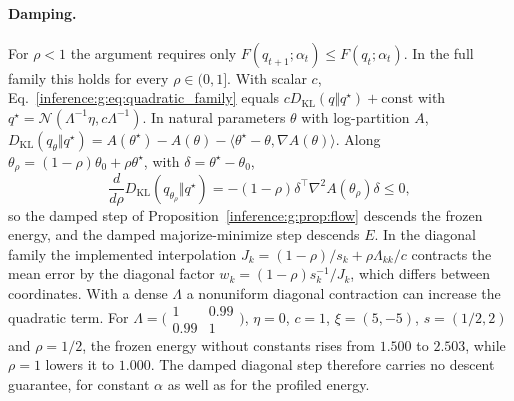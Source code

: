 \documentclass[11pt]{article}
\theoremstyle{definition}
\theoremstyle{remark}
\providecommand{\KL}{D_{\mathrm{KL}}}
\providecommand{\N}{\mathcal{N}}
\begin{document}
\paragraph{Damping.}
For $\rho<1$ the argument requires only $F(q_{t+1};\alpha_t)\le F(q_t;\alpha_t)$. In the full family this holds for every $\rho\in(0,1]$. With scalar $c$, Eq.~\eqref{inference:g:eq:quadratic_family} equals $c\KL(q\Vert q^\star)+\text{const}$ with $q^\star=\N(\Lambda^{-1}\eta,c\Lambda^{-1})$. In natural parameters $\theta$ with log-partition $A$, $\KL(q_\theta\Vert q^\star)=A(\theta^\star)-A(\theta)-\langle\theta^\star-\theta,\nabla A(\theta)\rangle$. Along $\theta_\rho=(1-\rho)\theta_0+\rho\theta^\star$, with $\delta=\theta^\star-\theta_0$,
\begin{equation}
\frac{d}{d\rho}\KL(q_{\theta_\rho}\Vert q^\star)=-(1-\rho)\delta^\top\nabla^2A(\theta_\rho)\delta\le0,
\end{equation}
so the damped step of Proposition~\ref{inference:g:prop:flow} descends the frozen energy, and the damped majorize-minimize step descends $E$. In the diagonal family the implemented interpolation $J_k=(1-\rho)/s_k+\rho\Lambda_{kk}/c$ contracts the mean error by the diagonal factor $w_k=(1-\rho)s_k^{-1}/J_k$, which differs between coordinates. With a dense $\Lambda$ a nonuniform diagonal contraction can increase the quadratic term. For $\Lambda=\bigl(\begin{smallmatrix}1&0.99\\0.99&1\end{smallmatrix}\bigr)$, $\eta=0$, $c=1$, $\xi=(5,-5)$, $s=(1/2,2)$ and $\rho=1/2$, the frozen energy without constants rises from $1.500$ to $2.503$, while $\rho=1$ lowers it to $1.000$. The damped diagonal step therefore carries no descent guarantee, for constant $\alpha$ as well as for the profiled energy.
\end{document}
